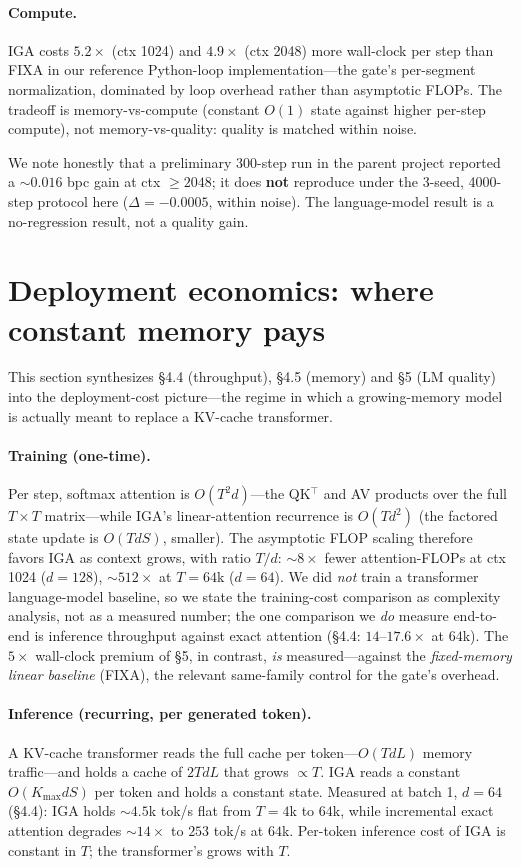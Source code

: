 \documentclass[11pt]{article}
\begin{document}
\paragraph{Compute.} IGA costs $5.2\times$ (ctx 1024) and $4.9\times$ (ctx 2048)
more wall-clock per step than FIXA in our reference Python-loop implementation---the
gate's per-segment normalization, dominated by loop overhead rather than
asymptotic FLOPs. The tradeoff is memory-vs-compute (constant $O(1)$ state against
higher per-step compute), not memory-vs-quality: quality is matched within noise.

We note honestly that a preliminary 300-step run in the parent project reported a
$\sim$$0.016$ bpc gain at ctx $\ge 2048$; it does \textbf{not} reproduce under the
3-seed, 4000-step protocol here ($\Delta=-0.0005$, within noise). The
language-model result is a no-regression result, not a quality gain.

\section{Deployment economics: where constant memory pays}

This section synthesizes \S4.4 (throughput), \S4.5 (memory) and \S5 (LM quality)
into the deployment-cost picture---the regime in which a growing-memory model is
actually meant to replace a KV-cache transformer.

\paragraph{Training (one-time).} Per step, softmax attention is $O(T^2 d)$---the
QK$^\top$ and AV products over the full $T\!\times\!T$ matrix---while IGA's
linear-attention recurrence is $O(Td^2)$ (the factored state update is $O(TdS)$,
smaller). The asymptotic FLOP scaling therefore favors IGA as context grows, with
ratio $T/d$: $\sim$$8\times$ fewer attention-FLOPs at ctx 1024 ($d=128$),
$\sim$$512\times$ at $T=64$k ($d=64$). We did \emph{not} train a transformer
language-model baseline, so we state the training-cost comparison as complexity
analysis, not as a measured number; the one comparison we \emph{do} measure
end-to-end is inference throughput against exact attention (\S4.4: $14$--$17.6\times$
at $64$k). The $5\times$ wall-clock premium of \S5, in contrast, \emph{is}
measured---against the \emph{fixed-memory linear baseline} (FIXA), the relevant
same-family control for the gate's overhead.

\paragraph{Inference (recurring, per generated token).} A KV-cache transformer
reads the full cache per token---$O(TdL)$ memory traffic---and holds a cache of
$2TdL$ that grows $\propto T$. IGA reads a constant $O(K_{\max}dS)$ per token and
holds a constant state. Measured at batch 1, $d=64$ (\S4.4): IGA holds
$\sim$$4.5$k tok/s flat from $T=4$k to $64$k, while incremental exact attention
degrades $\sim$$14\times$ to $253$ tok/s at $64$k. Per-token inference cost of IGA
is constant in $T$; the transformer's grows with $T$.
\end{document}
